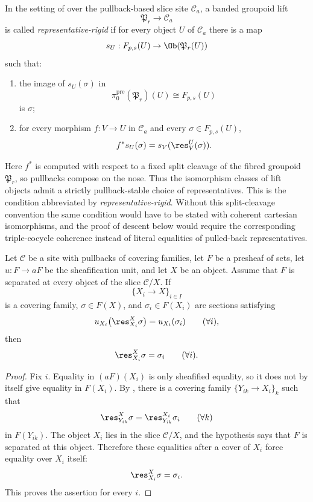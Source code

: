 \begin{definition}\label{def:representative-rigid-lift}
In the setting of  over the pullback-based slice site $\mathcal C_a$, a banded groupoid lift
\[
\mathfrak P_r\to \mathcal C_a
\]
is called \emph{representative-rigid} if for every object $U$ of $\mathcal C_a$ there is a map
\[
s_U:F_{p,s}(U)\to \Ob(\mathfrak P_r(U))
\]
such that:
\begin{enumerate}[label=(\roman*),nosep]
\item the image of $s_U(\sigma)$ in
\[
\pi_0^{\mathrm{pre}}(\mathfrak P_r)(U)\cong F_{p,s}(U)
\]
is $\sigma$;
\item for every morphism $f:V\to U$ in $\mathcal C_a$ and every $\sigma\in F_{p,s}(U)$,
\[
f^*s_U(\sigma)=s_V(\res_V^U(\sigma)).
\]
\end{enumerate}
Here \(f^*\) is computed with respect to a fixed split cleavage of the
fibred groupoid \(\mathfrak P_r\), so pullbacks compose on the nose. Thus
the isomorphism classes of lift objects admit a strictly pullback-stable choice
of representatives. This is the condition abbreviated by
\emph{representative-rigid}. Without this split-cleavage convention the same condition
would have to be stated with coherent cartesian isomorphisms, and the proof
of descent below would require the corresponding triple-cocycle coherence
instead of literal equalities of pulled-back representatives.
\end{definition}

\begin{lemma}\label{lem:unit-equality-on-cover-members}
Let $\mathcal C$ be a site with pullbacks of covering families, let \(F\)
be a presheaf of sets, let \(u:F\to aF\) be the sheafification unit, and
let \(X\) be an object. Assume that \(F\) is separated at every object of
the slice \(\mathcal C/X\). If
\[
\{X_i\to X\}_{i\in I}
\]
is a covering family, \(\sigma\in F(X)\), and
\(\sigma_i\in F(X_i)\) are sections satisfying
\[
u_{X_i}\bigl(\res_{X_i}^{X}\sigma\bigr)=u_{X_i}(\sigma_i)
\qquad(\forall i),
\]
then
\[
\res_{X_i}^{X}\sigma=\sigma_i
\qquad(\forall i).
\]
\end{lemma}

\begin{proof}
Fix \(i\). Equality in \((aF)(X_i)\) is only sheafified equality, so it
does not by itself give equality in \(F(X_i)\). By
, there is a covering family
\(\{Y_{ik}\to X_i\}_k\) such that
\[
\res_{Y_{ik}}^{X}\sigma=\res_{Y_{ik}}^{X_i}\sigma_i
\qquad(\forall k)
\]
in \(F(Y_{ik})\). The object \(X_i\) lies in the slice \(\mathcal C/X\),
and the hypothesis says that \(F\) is separated at this object. Therefore
these equalities after a cover of \(X_i\) force equality over \(X_i\)
itself:
\[
\res_{X_i}^{X}\sigma=\sigma_i.
\]
This proves the assertion for every \(i\).
\end{proof}

